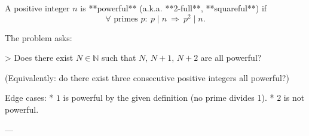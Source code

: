 A positive integer \(n\) is **powerful** (a.k.a. **2-full**, **squareful**) if
\[
\forall\text{ primes }p:\ p\mid n\ \Rightarrow\ p^2\mid n.
\]

The problem asks:

> Does there exist \(N\in\mathbb N\) such that \(N,\,N+1,\,N+2\) are all powerful?

(Equivalently: do there exist three consecutive positive integers all powerful?)

Edge cases:
* \(1\) is powerful by the given definition (no prime divides 1).
* \(2\) is not powerful.

---
